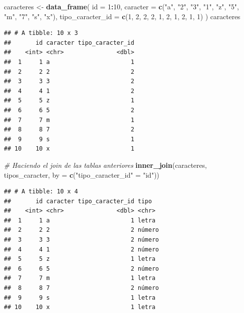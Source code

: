 \documentclass[]{book}
\newenvironment{Shaded}{\begin{snugshade}}{\end{snugshade}}
\newcommand{\KeywordTok}[1]{\textcolor[rgb]{0.13,0.29,0.53}{\textbf{#1}}}
\newcommand{\DataTypeTok}[1]{\textcolor[rgb]{0.13,0.29,0.53}{#1}}
\newcommand{\DecValTok}[1]{\textcolor[rgb]{0.00,0.00,0.81}{#1}}
\newcommand{\StringTok}[1]{\textcolor[rgb]{0.31,0.60,0.02}{#1}}
\newcommand{\CommentTok}[1]{\textcolor[rgb]{0.56,0.35,0.01}{\textit{#1}}}
\newcommand{\OperatorTok}[1]{\textcolor[rgb]{0.81,0.36,0.00}{\textbf{#1}}}
\newcommand{\NormalTok}[1]{#1}
\theoremstyle{definition}
\theoremstyle{definition}
\theoremstyle{definition}
\theoremstyle{remark}
\begin{document}
\begin{Shaded}
\begin{Highlighting}[]
\NormalTok{caracteres <-}\StringTok{ }\KeywordTok{data_frame}\NormalTok{(}
  \DataTypeTok{id =} \DecValTok{1}\OperatorTok{:}\DecValTok{10}\NormalTok{,}
  \DataTypeTok{caracter =} \KeywordTok{c}\NormalTok{(}\StringTok{"a"}\NormalTok{, }\StringTok{"2"}\NormalTok{, }\StringTok{"3"}\NormalTok{, }\StringTok{"1"}\NormalTok{, }\StringTok{"z"}\NormalTok{, }\StringTok{"5"}\NormalTok{, }\StringTok{"m"}\NormalTok{, }\StringTok{"7"}\NormalTok{, }\StringTok{"s"}\NormalTok{, }\StringTok{"x"}\NormalTok{),}
  \DataTypeTok{tipo_caracter_id =} \KeywordTok{c}\NormalTok{(}\DecValTok{1}\NormalTok{, }\DecValTok{2}\NormalTok{, }\DecValTok{2}\NormalTok{, }\DecValTok{2}\NormalTok{, }\DecValTok{1}\NormalTok{, }\DecValTok{2}\NormalTok{, }\DecValTok{1}\NormalTok{, }\DecValTok{2}\NormalTok{, }\DecValTok{1}\NormalTok{, }\DecValTok{1}\NormalTok{)}
\NormalTok{)}
\NormalTok{caracteres}
\end{Highlighting}
\end{Shaded}

\begin{verbatim}
## # A tibble: 10 x 3
##       id caracter tipo_caracter_id
##    <int> <chr>               <dbl>
##  1     1 a                       1
##  2     2 2                       2
##  3     3 3                       2
##  4     4 1                       2
##  5     5 z                       1
##  6     6 5                       2
##  7     7 m                       1
##  8     8 7                       2
##  9     9 s                       1
## 10    10 x                       1
\end{verbatim}

\begin{Shaded}
\begin{Highlighting}[]
\CommentTok{# Haciendo el join de las tablas anteriores}
\KeywordTok{inner_join}\NormalTok{(caracteres, tipos_caracter, }\DataTypeTok{by =} \KeywordTok{c}\NormalTok{(}\StringTok{"tipo_caracter_id"}\NormalTok{ =}\StringTok{ "id"}\NormalTok{))}
\end{Highlighting}
\end{Shaded}

\begin{verbatim}
## # A tibble: 10 x 4
##       id caracter tipo_caracter_id tipo  
##    <int> <chr>               <dbl> <chr> 
##  1     1 a                       1 letra 
##  2     2 2                       2 número
##  3     3 3                       2 número
##  4     4 1                       2 número
##  5     5 z                       1 letra 
##  6     6 5                       2 número
##  7     7 m                       1 letra 
##  8     8 7                       2 número
##  9     9 s                       1 letra 
## 10    10 x                       1 letra
\end{verbatim}
\end{document}
